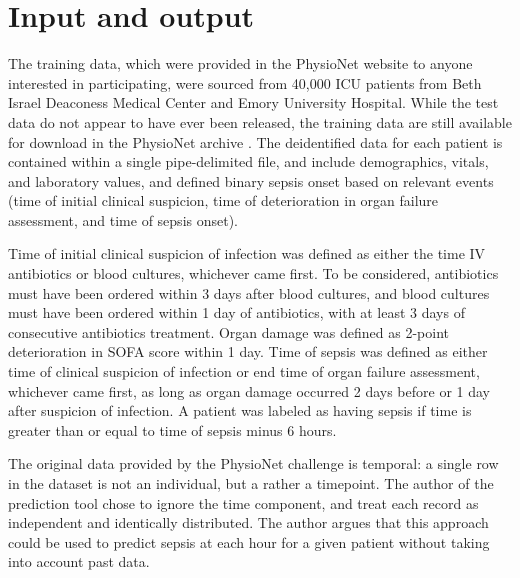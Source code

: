 \documentclass[10pt,letterpaper]{article}
\begin{document}
\section*{Input and output}


\par The training data, which were provided in the PhysioNet website to anyone interested in participating, were sourced from 40,000 ICU patients from Beth Israel Deaconess Medical Center and Emory University Hospital. While the test data do not appear to have ever been released, the training data are still available for download in the PhysioNet archive \cite{Goldberger2000}. The deidentified data for each patient is contained within a single pipe-delimited file, and include demographics, vitals, and laboratory values, and defined binary sepsis onset based on relevant events (time of initial clinical suspicion, time of deterioration in organ failure assessment, and time of sepsis onset).

\par Time of initial clinical suspicion of infection was defined as either the time IV antibiotics or blood cultures, whichever came first. To be considered, antibiotics must have been ordered within 3 days after blood cultures, and blood cultures must have been ordered within 1 day of antibiotics, with at least 3 days of consecutive antibiotics treatment. Organ damage was defined as 2-point deterioration in SOFA score within 1 day. Time of sepsis was defined as either time of clinical suspicion of infection or end time of organ failure assessment, whichever came first, as long as organ damage occurred 2 days before or 1 day after suspicion of infection. A patient was labeled as having sepsis if time is greater than or equal to time of sepsis minus 6 hours.

\par The original data provided by the PhysioNet challenge is temporal: a single row in the dataset is not an individual, but a rather a timepoint. The author of the prediction tool chose to ignore the time component, and treat each record as independent and identically distributed. The author argues that this approach could be used to predict sepsis at each hour for a given patient without taking into account past data.
\end{document}
